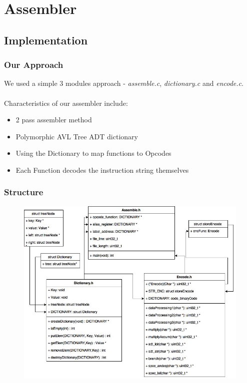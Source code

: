 \documentclass{beamer}
\begin{document}
\section{Assembler}


\subsection{Implementation}

\begin{frame}
\frametitle{Our Approach}

We used a simple 3 modules approach - \textit{assemble.c}, \textit{dictionary.c} and \textit{encode.c}. 
\\~\\

Characteristics of our assembler include: 
\begin{itemize}
\item 2 pass assembler method

\item Polymorphic AVL Tree ADT dictionary

\item Using the Dictionary to map functions to Opcodes

\item Each Function decodes the instruction string themselves

\end{itemize}

\end{frame}


\begin{frame}
\frametitle{Structure}

\begin{figure}[c]
\includegraphics[width=0.9\linewidth]{Images/Assembler_XML.jpg}
\end{figure}


\end{frame}
\end{document}
